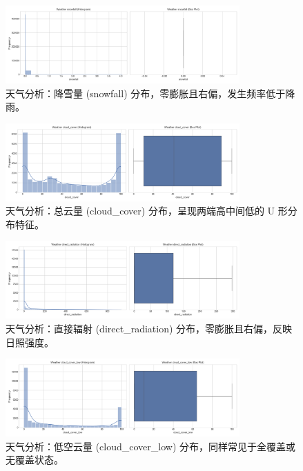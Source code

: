 \documentclass{article} %
\begin{document}
\begin{figure}[H]
    \centering
    \includegraphics[width=0.8\textwidth]{../plots/weather_distribution_snowfall.png}
    \caption{天气分析：降雪量 (snowfall) 分布，零膨胀且右偏，发生频率低于降雨。} %
    \label{fig:weather_dist_snowfall}
\end{figure}

\begin{figure}[H]
    \centering
    \includegraphics[width=0.8\textwidth]{../plots/weather_distribution_cloud_cover.png}
    \caption{天气分析：总云量 (cloud\_cover) 分布，呈现两端高中间低的 U 形分布特征。} %
    \label{fig:weather_dist_cloud}
\end{figure}

\begin{figure}[H]
    \centering
    \includegraphics[width=0.8\textwidth]{../plots/weather_distribution_direct_radiation.png}
    \caption{天气分析：直接辐射 (direct\_radiation) 分布，零膨胀且右偏，反映日照强度。} %
    \label{fig:weather_dist_radiation}
\end{figure}

\begin{figure}[H]
    \centering
    \includegraphics[width=0.8\textwidth]{../plots/weather_distribution_cloud_cover_low.png}
    \caption{天气分析：低空云量 (cloud\_cover\_low) 分布，同样常见于全覆盖或无覆盖状态。} %
    \label{fig:weather_dist_cloud_low}
\end{figure}
\end{document}
